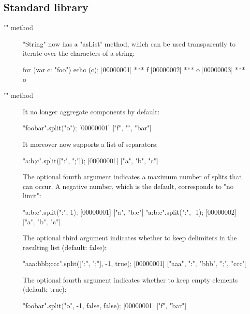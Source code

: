 \subsection{Standard library}
\begin{description}

\item["" method]

"String" now has a "asList" method, which can be used transparently
to iterate over the characters of a string:

\begin{urbiscript}
for (var c: "foo") echo (c);
[00000001] *** f
[00000002] *** o
[00000003] *** o
\end{urbiscript}

\item["" method]

  It no longer aggregate components by default:

\begin{urbiscript}
"foobar".split("o");
[00000001] ["f", "", "bar"]
\end{urbiscript}

It moreover now supports a list of separators:

\begin{urbiscript}
"a:b;c".split([":", ";"]);
[00000001] ["a", "b", "c"]
\end{urbiscript}

The optional fourth argument indicates a maximum number of splits that
can occur. A negative number, which is the default, corresponds to
"no limit":

\begin{urbiscript}
"a:b:c".split(":", 1);
[00000001] ["a", "b:c"]
"a:b:c".split(":", -1);
[00000002] ["a", "b", "c"]
\end{urbiscript}

The optional third argument indicates whether to keep delimiters in
the resulting list (default: false):

\begin{urbiscript}
"aaa:bbb;ccc".split([":", ";"], -1, true);
[00000001] ["aaa", ":", "bbb", ";", "ccc"]
\end{urbiscript}

The optional fourth argument indicates whether to keep empty elements
(default: true):

\begin{urbiscript}
"foobar".split("o", -1, false, false);
[00000001] ["f", "bar"]
\end{urbiscript}


\end{description}
